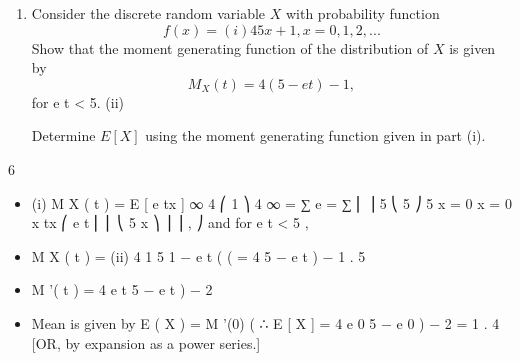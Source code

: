 \documentclass[a4paper,12pt]{article}
\begin{document}
\begin{enumerate}


\item

Consider the discrete random variable $X$ with probability function
\[f ( x ) =
(i)
4
5 x + 1
,
x = 0, 1, 2, ...\]
Show that the moment generating function of the distribution of $X$ is given by
\[M_X ( t ) = 4(5 − e t ) − 1 ,\]
for e t < 5.
(ii)

Determine $E[X]$ using the moment generating function given in part (i).
\end{enumerate}
\newpage


6
\begin{itemize}
\item (i)
M X ( t ) = E [ e tx ]
∞
4 ⎛ 1 ⎞
4 ∞
= ∑ e
=
∑
⎜ ⎟
5 ⎝ 5 ⎠
5 x = 0
x = 0
x
tx
⎛ e t
⎜ ⎜
⎝ 5
x
⎞
⎟ ⎟ ,
⎠
and for e t < 5 ,
\item M X ( t ) =
(ii)
4 1
5 1 − e t
(
(
= 4 5 − e t
)
− 1
.
5
\item M '( t ) = 4 e t 5 − e t
)
− 2
\item Mean is given by E ( X ) = M '(0)
(
∴ E [ X ] = 4 e 0 5 − e 0
)
− 2
=
1
.
4
[OR, by expansion as a power series.]
\end{itemize}
\end{document}
